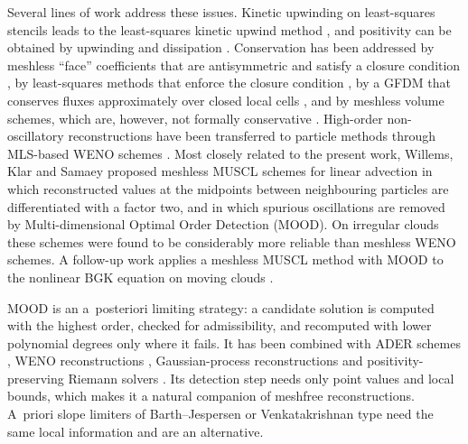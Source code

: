 \documentclass[11pt,a4paper]{article}
\numberwithin{equation}{section}
\begin{document}
Several lines of work address these issues. Kinetic upwinding on least-squares stencils leads to the least-squares kinetic upwind method \cite{Ghosh1995,Ramesh2001}, and positivity can be obtained by upwinding and dissipation \cite{Chandrashekar2004}. Conservation has been addressed by meshless ``face'' coefficients that are antisymmetric and satisfy a closure condition \cite{Chiu2011,Chiu2012}, by least-squares methods that enforce the closure condition \cite{Huh2018}, by a GFDM that conserves fluxes approximately over closed local cells \cite{Suchde2017,SuchdeThesis2018}, and by meshless volume schemes, which are, however, not formally conservative \cite{Katz2009}. High-order non-oscillatory reconstructions have been transferred to particle methods through MLS-based WENO schemes \cite{Avesani2014}. Most closely related to the present work, Willems, Klar and Samaey \cite{Willems2025,WillemsCode2025} proposed meshless MUSCL schemes for linear advection in which reconstructed values at the midpoints between neighbouring particles are differentiated with a factor two, and in which spurious oscillations are removed by Multi-dimensional Optimal Order Detection (MOOD). On irregular clouds these schemes were found to be considerably more reliable than meshless WENO schemes. A follow-up work applies a meshless MUSCL method with MOOD to the nonlinear BGK equation on moving clouds \cite{Willems2025BGK}.

MOOD \cite{Clain2011,Diot2012,Diot2013} is an a~posteriori limiting strategy: a candidate solution is computed with the highest order, checked for admissibility, and recomputed with lower polynomial degrees only where it fails. It has been combined with ADER schemes \cite{Loubere2014,Boscheri2015}, WENO reconstructions \cite{Farmakis2020}, Gaussian-process reconstructions \cite{Bourgeois2022} and positivity-preserving Riemann solvers \cite{Chan2021}. Its detection step needs only point values and local bounds, which makes it a natural companion of meshfree reconstructions. A~priori slope limiters of Barth--Jespersen or Venkatakrishnan type \cite{BarthJespersen1989,Venkatakrishnan1995,Hubbard1999} need the same local information and are an alternative.
\end{document}
